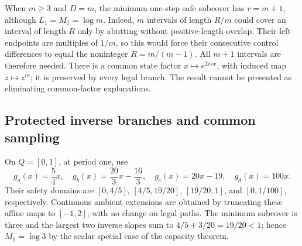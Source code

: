 \documentclass[11pt,reqno]{amsart}
\numberwithin{equation}{section}
\theoremstyle{definition}
\begin{document}
When $m\ge3$ and $D=m$, the minimum one-step safe subcover has
$r=m+1$, although $L_1=M_1=\log m$. Indeed, $m$ intervals of
length $R/m$ could cover an interval of length $R$ only by abutting
without positive-length overlap. Their left endpoints are multiples
of $1/m$, so this would force their consecutive control differences
to equal the noninteger $R=m/(m-1)$. All $m+1$ intervals are
therefore needed. There is a common state factor
$x\mapsto e^{2\pi ix}$, with induced map $z\mapsto z^m$;
it is preserved by every legal branch. The result cannot be presented
as eliminating common-factor explanations.

\subsection{Protected inverse branches and common sampling}
On $Q=[0,1]$, at period one, use
\[
 g_a(x)=\frac54x,\quad g_b(x)=\frac{20}3x-\frac{16}3,
 \quad g_c(x)=20x-19,\quad g_d(x)=100x.
\]
Their safety domains are
$[0,4/5]$, $[4/5,19/20]$, $[19/20,1]$, and
$[0,1/100]$, respectively. Continuous ambient extensions are
obtained by truncating these affine maps to $[-1,2]$, with no
change on legal paths. The minimum subcover is three and the largest
two inverse slopes sum to $4/5+3/20=19/20<1$; hence
$M_1=\log3$ by the scalar special case of the capacity theorem.
\end{document}
